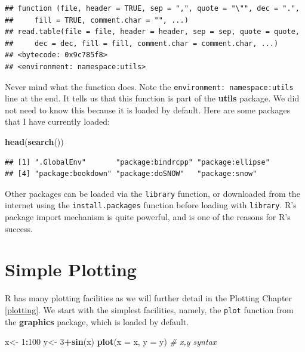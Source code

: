 \documentclass[]{book}
\newenvironment{Shaded}{\begin{snugshade}}{\end{snugshade}}
\newcommand{\KeywordTok}[1]{\textcolor[rgb]{0.13,0.29,0.53}{\textbf{#1}}}
\newcommand{\DataTypeTok}[1]{\textcolor[rgb]{0.13,0.29,0.53}{#1}}
\newcommand{\DecValTok}[1]{\textcolor[rgb]{0.00,0.00,0.81}{#1}}
\newcommand{\StringTok}[1]{\textcolor[rgb]{0.31,0.60,0.02}{#1}}
\newcommand{\CommentTok}[1]{\textcolor[rgb]{0.56,0.35,0.01}{\textit{#1}}}
\newcommand{\OperatorTok}[1]{\textcolor[rgb]{0.81,0.36,0.00}{\textbf{#1}}}
\newcommand{\NormalTok}[1]{#1}
\theoremstyle{definition}
\theoremstyle{definition}
\theoremstyle{definition}
\theoremstyle{remark}
\begin{document}
\begin{verbatim}
## function (file, header = TRUE, sep = ",", quote = "\"", dec = ".", 
##     fill = TRUE, comment.char = "", ...) 
## read.table(file = file, header = header, sep = sep, quote = quote, 
##     dec = dec, fill = fill, comment.char = comment.char, ...)
## <bytecode: 0x9c785f8>
## <environment: namespace:utils>
\end{verbatim}

Never mind what the function does. Note the
\texttt{environment:\ namespace:utils} line at the end. It tells us that
this function is part of the \textbf{utils} package. We did not need to
know this because it is loaded by default. Here are some packages that I
have currently loaded:

\begin{Shaded}
\begin{Highlighting}[]
\KeywordTok{head}\NormalTok{(}\KeywordTok{search}\NormalTok{())}
\end{Highlighting}
\end{Shaded}

\begin{verbatim}
## [1] ".GlobalEnv"       "package:bindrcpp" "package:ellipse" 
## [4] "package:bookdown" "package:doSNOW"   "package:snow"
\end{verbatim}

Other packages can be loaded via the \texttt{library} function, or
downloaded from the internet using the \texttt{install.packages}
function before loading with \texttt{library}. R's package import
mechanism is quite powerful, and is one of the reasons for R's success.

\section{Simple Plotting}\label{simple-plotting}

R has many plotting facilities as we will further detail in the Plotting
Chapter \ref{plotting}. We start with the simplest facilities, namely,
the \texttt{plot} function from the \textbf{graphics} package, which is
loaded by default.

\begin{Shaded}
\begin{Highlighting}[]
\NormalTok{x<-}\StringTok{ }\DecValTok{1}\OperatorTok{:}\DecValTok{100}
\NormalTok{y<-}\StringTok{ }\DecValTok{3}\OperatorTok{+}\KeywordTok{sin}\NormalTok{(x) }
\KeywordTok{plot}\NormalTok{(}\DataTypeTok{x =}\NormalTok{ x, }\DataTypeTok{y =}\NormalTok{ y) }\CommentTok{# x,y syntax                         }
\end{Highlighting}
\end{Shaded}
\end{document}
